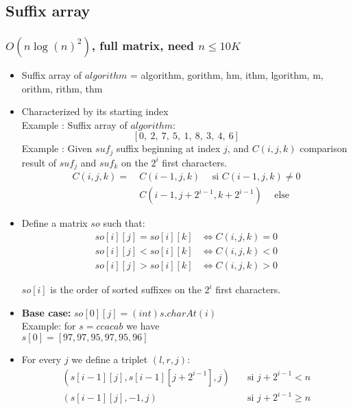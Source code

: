 \subsection{Suffix array}
\subsubsection{$O(n\log(n)^2)$, full matrix, need $n \leq 10K$}
\begin{itemize}
\item Suffix array of $algorithm$ = algorithm, gorithm, hm, ithm, lgorithm, m, orithm, rithm, thm

\item Characterized by its starting index\\
Example : Suffix array of $algorithm$: $$[0, \ 2, \ 7, \ 5, \ 1, \ 8, \ 3, \ 4, \ 6]$$
Example : Given $suf_j$ suffix beginning at index $j$, and $C(i, j, k)$ comparison result of $suf_j$ and $suf_k$ on the $2^i$ first characters.
\begin{align*}
C(i, j, k) = & \ C(i - 1, j, k) \hspace{15pt} \text{si $C(i - 1, j, k) \neq 0$} \\
             & \ C(i - 1, j + 2^{i - 1}, k + 2^{i - 1}) \hspace{15pt} \text{else}
\end{align*}

\end{itemize}
\begin{itemize}

\item Define a matrix $so$ such that:
\begin{align*}
so[i][j] = so[i][k] & \Leftrightarrow C(i, j, k) = 0 \\
so[i][j] < so[i][k] & \Leftrightarrow C(i, j, k) < 0 \\
so[i][j] > so[i][k] & \Leftrightarrow C(i, j, k) > 0 
\end{align*}

$so[i]$ is the order of sorted suffixes on the $2^i$ first characters.

\end{itemize}

\begin{itemize}

\item\textbf{Base case: }$so[0][j] = (int)s.charAt(i) $\\
Example: for $s = ccacab$ we have \\$ s[0] = [97, 97, 95, 97, 95, 96]$
\item For every $j$ we define a triplet $(l, r, j)$:
\begin{align*}
(s[i - 1][j], s[i - 1][j + 2^{i - 1}], j) & \quad \text{si $j + 2^{i - 1} < n$} \\
(s[i - 1][j], -1, j) & \quad \text{si $j + 2^{i - 1} \geq n$}
\end{align*}

\end{itemize}

